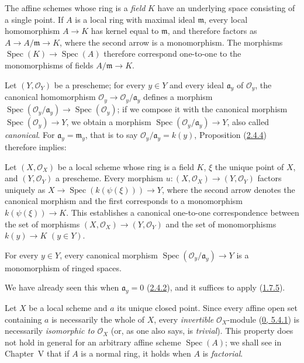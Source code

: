 \begin{env}[2.4.5]
\label{I.2.4.5}
The affine schemes whose ring is a \emph{field} $K$ have an underlying
space consisting of a single point. If $A$ is a local ring with maximal
ideal $\mathfrak{m}$, every local homomorphism $A\to K$ has kernel equal to
$\mathfrak{m}$, and therefore factors as
$A\to A/\mathfrak{m}\to K$, where the second arrow is a monomorphism. The
morphisms $\operatorname{Spec}(K)\to\operatorname{Spec}(A)$ therefore
correspond one-to-one to the monomorphisms of fields
$A/\mathfrak{m}\to K$.
\end{env}

Let $(Y,\mathscr{O}_Y)$ be a prescheme; for every $y\in Y$ and every ideal
$\mathfrak{a}_y$ of $\mathscr{O}_y$, the canonical homomorphism
$\mathscr{O}_y\to\mathscr{O}_y/\mathfrak{a}_y$ defines a morphism
$\operatorname{Spec}(\mathscr{O}_y/\mathfrak{a}_y)
\to\operatorname{Spec}(\mathscr{O}_y)$; if we compose it with the canonical
morphism $\operatorname{Spec}(\mathscr{O}_y)\to Y$, we obtain a morphism
$\operatorname{Spec}(\mathscr{O}_y/\mathfrak{a}_y)\to Y$, also called
\emph{canonical}. For $\mathfrak{a}_y=\mathfrak{m}_y$, that is to say
$\mathscr{O}_y/\mathfrak{a}_y=k(y)$, Proposition
(\hyperref[I.2.4.4]{2.4.4}) therefore implies:

\begin{corollary}[2.4.6]
\label{I.2.4.6}
Let $(X,\mathscr{O}_X)$ be a local scheme whose ring is a field $K$,
$\xi$ the unique point of $X$, and $(Y,\mathscr{O}_Y)$ a prescheme. Every
morphism $u:(X,\mathscr{O}_X)\to(Y,\mathscr{O}_Y)$ factors uniquely as
$X\to\operatorname{Spec}(k(\psi(\xi)))\to Y$, where the second arrow denotes
the canonical morphism and the first corresponds to a monomorphism
$k(\psi(\xi))\to K$. This establishes a canonical one-to-one correspondence
between the set of morphisms $(X,\mathscr{O}_X)\to(Y,\mathscr{O}_Y)$ and
the set of monomorphisms $k(y)\to K$ $(y\in Y)$.
\end{corollary}

\begin{corollary}[2.4.7]
\label{I.2.4.7}
For every $y\in Y$, every canonical morphism
$\operatorname{Spec}(\mathscr{O}_y/\mathfrak{a}_y)\to Y$ is a monomorphism
of ringed spaces.
\end{corollary}

We have already seen this when $\mathfrak{a}_y=0$
(\hyperref[I.2.4.2]{2.4.2}), and it suffices to apply
(\hyperref[I.1.7.5]{1.7.5}).

\begin{remark}[2.4.8]
\label{I.2.4.8}
Let $X$ be a local scheme and $a$ its unique closed point. Since every
affine open set containing $a$ is necessarily the whole of $X$, every
\emph{invertible} $\mathscr{O}_X$-module
(\hyperref[0.5.4.1]{0, 5.4.1}) is necessarily \emph{isomorphic to
$\mathscr{O}_X$} (or, as one also says, is \emph{trivial}). This property
does not hold in general for an arbitrary affine scheme
$\operatorname{Spec}(A)$; we shall see in Chapter~V that if $A$ is a normal
ring, it holds when $A$ is \emph{factorial}.
\end{remark}

